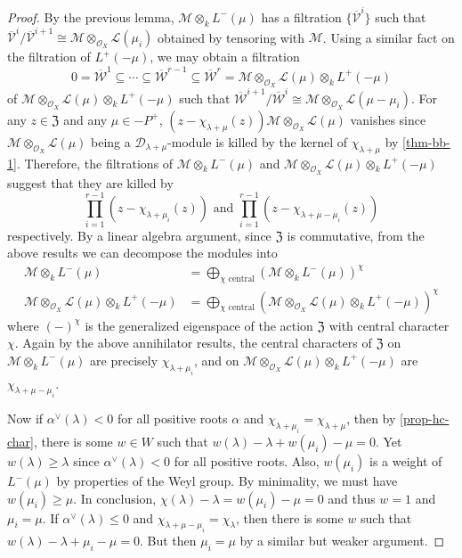 \documentclass[11pt, a4paper]{article}
\theoremstyle{definition}
\begin{document}
    \begin{proof}
        By the previous lemma, $\mathcal M\otimes_k L^-(\mu)$ has a filtration $\{\overline{\mathcal V}^i\}$ such that $\overline{\mathcal V}^i/\overline{\mathcal V}^{i+1}\cong \mathcal M\otimes_{\mathcal O_X}\mathcal L(\mu_i)$ obtained by tensoring with $\mathcal M$. Using a similar fact on the filtration of $L^+(-\mu)$, we may obtain a filtration 
        \[0=\overline{\mathcal W}^1\subseteq\cdots\subseteq\overline{\mathcal W}^{r-1}\subseteq\overline{\mathcal W}^r=\mathcal M\otimes_{\mathcal O_X}\mathcal L(\mu)\otimes_k L^+(-\mu)\]
        of $\mathcal M\otimes_{\mathcal O_X}\mathcal L(\mu)\otimes_k L^+(-\mu)$ such that $\overline{\mathcal W}^{i+1}/\overline{\mathcal W}^i\cong\mathcal M\otimes_{\mathcal O_X}\mathcal L(\mu-\mu_i)$. For any $z\in\mathfrak Z$ and any $\mu\in -P^+$, $(z-\chi_{\lambda+\mu}(z))\mathcal M\otimes_{\mathcal O_X}\mathcal L(\mu)$ vanishes since $\mathcal M\otimes_{\mathcal O_X}\mathcal L(\mu)$ being a $\mathcal D_{\lambda+\mu}$-module is killed by the kernel of $\chi_{\lambda+\mu}$ by \cref{thm-bb-1}. Therefore, the filtrations of $\mathcal M\otimes_k L^-(\mu)$ and $\mathcal M\otimes_{\mathcal O_X}\mathcal L(\mu)\otimes_k L^+(-\mu)$ suggest that they are killed by
        \[\prod_{i=1}^{r-1}(z-\chi_{\lambda+\mu_i}(z))\mbox{ and }\prod_{i=1}^{r-1}(z-\chi_{\lambda+\mu-\mu_i}(z))\]
        respectively. By a linear algebra argument, since $\mathfrak Z$ is commutative, from the above results we can decompose the modules into
        \begin{align*}
            \mathcal M\otimes_k L^-(\mu)&=\bigoplus_{\chi\text{ central}}(\mathcal M\otimes_k L^-(\mu))^\chi\\
            \mathcal M\otimes_{\mathcal O_X}\mathcal L(\mu)\otimes_k L^+(-\mu)&=\bigoplus_{\chi\text{ central}}(\mathcal M\otimes_{\mathcal O_X}\mathcal L(\mu)\otimes_k L^+(-\mu))^\chi
        \end{align*}
        where $(-)^\chi$ is the generalized eigenspace of the action $\mathfrak Z$ with central character $\chi$. Again by the above annihilator results, the central characters of $\mathfrak Z$ on $\mathcal M\otimes_k L^-(\mu)$ are precisely $\chi_{\lambda+\mu_i}$, and on $\mathcal M\otimes_{\mathcal O_X}\mathcal L(\mu)\otimes_k L^+(-\mu)$ are $\chi_{\lambda+\mu-\mu_i}$.

        Now if $\alpha^\vee(\lambda)<0$ for all positive roots $\alpha$ and $\chi_{\lambda+\mu_i}=\chi_{\lambda+\mu}$, then by \cref{prop-hc-char}, there is some $w\in W$ such that $w(\lambda)-\lambda+w(\mu_i)-\mu=0$. Yet $w(\lambda)\geqslant \lambda$ since $\alpha^\vee(\lambda)<0$ for all positive roots. Also, $w(\mu_i)$ is a weight of $L^-(\mu)$ by properties of the Weyl group. By minimality, we must have $w(\mu_i)\geqslant \mu$. In conclusion, $\chi(\lambda)-\lambda=w(\mu_i)-\mu=0$ and thus $w=1$ and $\mu_i=\mu$. If $\alpha^\vee(\lambda)\leqslant 0$ and $\chi_{\lambda+\mu-\mu_i}=\chi_{\lambda}$, then there is some $w$ such that $w(\lambda)-\lambda+\mu_i-\mu=0$. But then $\mu_i=\mu$ by a similar but weaker argument.


\end{proof}
\end{document}
